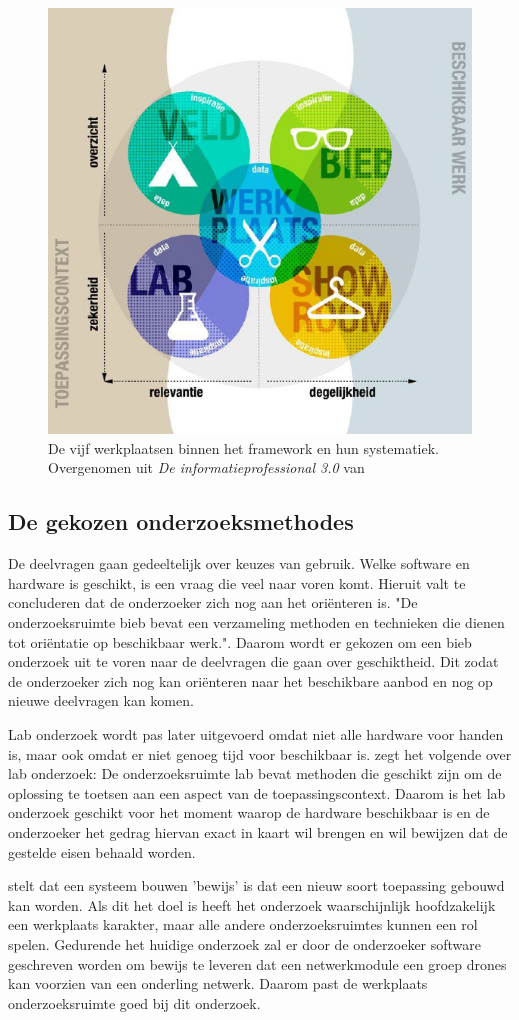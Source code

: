 \documentclass[a4paper, 11pt, oneside]{report}
\begin{document}
\begin{figure}[H]
	\begin{center}\includegraphics[width=0.5\linewidth]{Methodenkaart}\end{center}
	\caption{De vijf werkplaatsen binnen het framework en hun systematiek. Overgenomen uit \textit{De informatieprofessional 3.0}  van \protect{}  }
	\label{fig:methodenkaart}
\end{figure}

\subsection{De gekozen onderzoeksmethodes}

De deelvragen gaan gedeeltelijk over keuzes van gebruik. 
Welke software en hardware is geschikt, is een vraag die veel naar voren komt.
Hieruit valt te concluderen dat de onderzoeker zich nog aan het oriënteren is.
"De onderzoeksruimte bieb bevat een verzameling methoden en technieken die dienen tot oriëntatie op beschikbaar werk."\cite{MethodenKaart}.
Daarom wordt er gekozen om een bieb onderzoek uit te voren naar de deelvragen die gaan over geschiktheid.
Dit zodat de onderzoeker zich nog kan oriënteren naar het beschikbare aanbod en nog op nieuwe deelvragen kan komen. 

Lab onderzoek wordt pas later uitgevoerd omdat niet alle hardware voor handen is, maar ook omdat er niet genoeg tijd voor beschikbaar is.
\citeauthor{MethodenKaart} zegt het volgende over lab onderzoek: De onderzoeksruimte lab bevat methoden die geschikt zijn om de oplossing te toetsen aan een aspect van de toepassingscontext.
Daarom is het lab onderzoek geschikt voor het moment waarop de hardware beschikbaar is en de onderzoeker het gedrag hiervan exact in kaart wil brengen en wil bewijzen dat de gestelde eisen behaald worden.

 stelt dat een systeem bouwen 'bewijs' is dat een nieuw soort toepassing gebouwd kan worden. Als dit het doel is heeft het onderzoek waarschijnlijk hoofdzakelijk een werkplaats karakter, maar alle andere onderzoeksruimtes kunnen een rol spelen.
Gedurende het huidige onderzoek zal er door de onderzoeker software geschreven worden om bewijs te leveren dat een netwerkmodule een groep drones kan voorzien van een onderling netwerk.
Daarom past de werkplaats onderzoeksruimte goed bij dit onderzoek.
\end{document}
